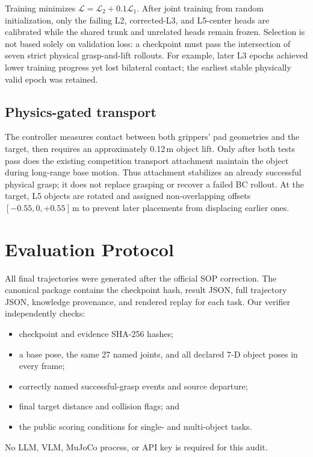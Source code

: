 \documentclass[10pt,twocolumn]{article}
\begin{document}
Training minimizes $\mathcal{L}=\mathcal{L}_2+0.1\mathcal{L}_1$. After joint training from random initialization, only the failing L2, corrected-L3, and L5-center heads are calibrated while the shared trunk and unrelated heads remain frozen. Selection is not based solely on validation loss: a checkpoint must pass the intersection of seven strict physical grasp-and-lift rollouts. For example, later L3 epochs achieved lower training progress yet lost bilateral contact; the earliest stable physically valid epoch was retained.

\subsection{Physics-gated transport}

The controller measures contact between both grippers' pad geometries and the target, then requires an approximately 0.12\,m object lift. Only after both tests pass does the existing competition transport attachment maintain the object during long-range base motion. Thus attachment stabilizes an already successful physical grasp; it does not replace grasping or recover a failed BC rollout. At the target, L5 objects are rotated and assigned non-overlapping offsets $[-0.55,0,+0.55]$\,m to prevent later placements from displacing earlier ones.

\section{Evaluation Protocol}

All final trajectories were generated after the official SOP correction. The canonical package contains the checkpoint hash, result JSON, full trajectory JSON, knowledge provenance, and rendered replay for each task. Our verifier independently checks:
\begin{itemize}
  \item checkpoint and evidence SHA-256 hashes;
  \item a base pose, the same 27 named joints, and all declared 7-D object poses in every frame;
  \item correctly named successful-grasp events and source departure;
  \item final target distance and collision flags; and
  \item the public scoring conditions for single- and multi-object tasks.
\end{itemize}
No LLM, VLM, MuJoCo process, or API key is required for this audit.
\end{document}
